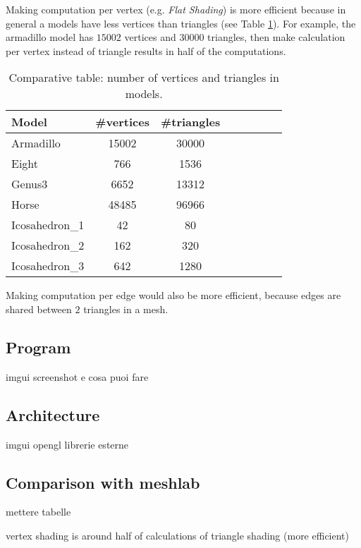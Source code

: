 Making computation per vertex (e.g. \textit{Flat Shading}) is more efficient because in general a models have less vertices than triangles (see Table \ref{table:model-table-vertices}).
For example, the armadillo model has $15002$ vertices and $30000$ triangles, then make calculation per vertex instead of triangle results in half of the computations.

\begin{table}[!h]
    \centering
\begin{tabular}{l*{6}{c}r}
    \centering
    Model              & \#vertices & \#triangles \\
    \hline
    Armadillo          & 15002 & 30000 \\
    Eight              & 766 & 1536 \\
    Genus3             & 6652 & 13312  \\
    Horse              & 48485 &  96966\\
    Icosahedron\_1      &  42 & 80 \\
    Icosahedron\_2      &  162 & 320 \\
    Icosahedron\_3      & 642 &  1280
\end{tabular}
\caption{Comparative table: number of vertices and triangles in models.}
\label{table:model-table-vertices}
\end{table}

Making computation per edge would also be more efficient, because edges are shared between $2$ triangles in a mesh.

\subsection{Program}
imgui screenshot e cosa puoi fare

\subsection{Architecture}
imgui opengl librerie esterne


\subsection{Comparison with meshlab}
mettere tabelle

vertex shading is around half of calculations of triangle shading (more efficient)

